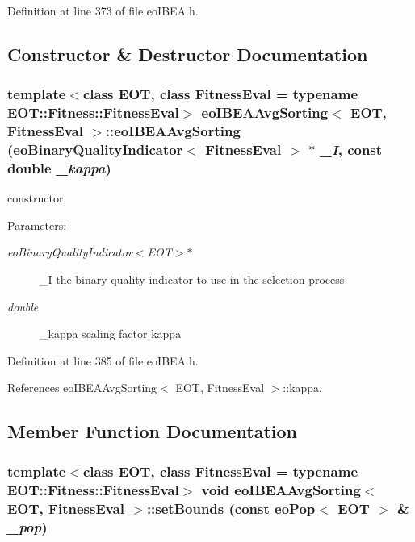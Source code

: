 Definition at line 373 of file eo\-IBEA.h.

\subsection{Constructor \& Destructor Documentation}
\subsubsection{\setlength{\rightskip}{0pt plus 5cm}template$<$class EOT, class Fitness\-Eval = typename EOT::Fitness::Fitness\-Eval$>$ {\bf eo\-IBEAAvg\-Sorting}$<$ EOT, Fitness\-Eval $>$::{\bf eo\-IBEAAvg\-Sorting} ({\bf eo\-Binary\-Quality\-Indicator}$<$ Fitness\-Eval $>$ $\ast$ {\em \_\-I}, const double {\em \_\-kappa})\hspace{0.3cm}{\tt  [inline]}}\label{classeoIBEAAvgSorting_eb0cfda626e1e5cac6750f0598610f82}


constructor 

\begin{Desc}
\item[Parameters:]
\begin{description}
\item[{\em eo\-Binary\-Quality\-Indicator$<$EOT$>$$\ast$}]\_\-I the binary quality indicator to use in the selection process \item[{\em double}]\_\-kappa scaling factor kappa \end{description}
\end{Desc}


Definition at line 385 of file eo\-IBEA.h.

References eo\-IBEAAvg\-Sorting$<$ EOT, Fitness\-Eval $>$::kappa.

\subsection{Member Function Documentation}
\subsubsection{\setlength{\rightskip}{0pt plus 5cm}template$<$class EOT, class Fitness\-Eval = typename EOT::Fitness::Fitness\-Eval$>$ void {\bf eo\-IBEAAvg\-Sorting}$<$ EOT, Fitness\-Eval $>$::set\-Bounds (const {\bf eo\-Pop}$<$ EOT $>$ \& {\em \_\-pop})\hspace{0.3cm}{\tt  [inline, private, virtual]}}\label{classeoIBEAAvgSorting_b365a1eab0da5211c59369416642780d}



